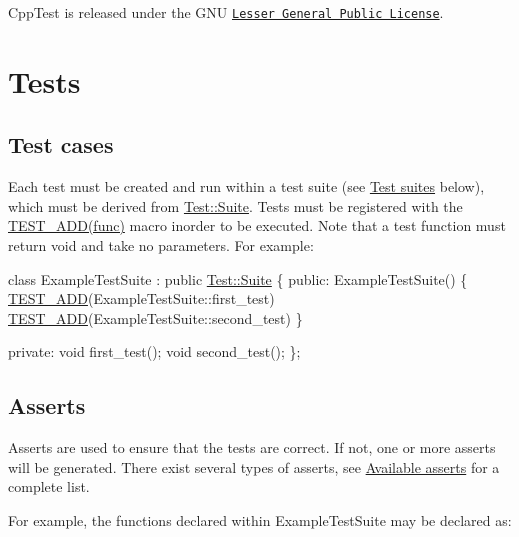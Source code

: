 Cpp\+Test is released under the G\+NU \href{http://www.gnu.org/copyleft/lesser.html}{\tt Lesser General Public License}.\hypertarget{tutorial_tutorial_tests}{}\section{Tests}\label{tutorial_tutorial_tests}
\hypertarget{tutorial_tutorial_test_cases}{}\subsection{Test cases}\label{tutorial_tutorial_test_cases}
Each test must be created and run within a test suite (see \hyperlink{tutorial_tutorial_test_suites}{Test suites} below), which must be derived from \hyperlink{class_test_1_1_suite}{Test\+::\+Suite}. Tests must be registered with the \hyperlink{cpptest-suite_8h_abe8c3e0a2cf3893ebc1c265264ed9cb8}{T\+E\+S\+T\+\_\+\+A\+D\+D(func)} macro inorder to be executed. Note that a test function must return {\ttfamily void} and take no parameters. For example\+:


\begin{DoxyCode}
\textcolor{keyword}{class }ExampleTestSuite : \textcolor{keyword}{public} \hyperlink{class_test_1_1_suite}{Test::Suite}
\{
\textcolor{keyword}{public}:
    ExampleTestSuite()
    \{
        \hyperlink{cpptest-suite_8h_abe8c3e0a2cf3893ebc1c265264ed9cb8}{TEST\_ADD}(ExampleTestSuite::first\_test)
        \hyperlink{cpptest-suite_8h_abe8c3e0a2cf3893ebc1c265264ed9cb8}{TEST\_ADD}(ExampleTestSuite::second\_test)
    \}
    
private:
    \textcolor{keywordtype}{void} first\_test();
    \textcolor{keywordtype}{void} second\_test();
\};
\end{DoxyCode}
\hypertarget{tutorial_tutorial_asserts}{}\subsection{Asserts}\label{tutorial_tutorial_asserts}
Asserts are used to ensure that the tests are correct. If not, one or more asserts will be generated. There exist several types of asserts, see \hyperlink{asserts}{Available asserts} for a complete list.

For example, the functions declared within {\ttfamily Example\+Test\+Suite} may be declared as\+:


